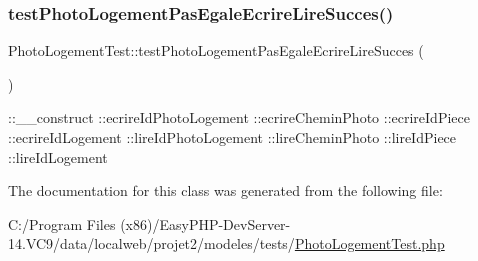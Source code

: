 \subsubsection{\texorpdfstring{test\+Photo\+Logement\+Pas\+Egale\+Ecrire\+Lire\+Succes()}{testPhotoLogementPasEgaleEcrireLireSucces()}}
{\footnotesize\ttfamily Photo\+Logement\+Test\+::test\+Photo\+Logement\+Pas\+Egale\+Ecrire\+Lire\+Succes (\begin{DoxyParamCaption}{ }\end{DoxyParamCaption})}

\+::\+\_\+\+\_\+construct  \+::ecrire\+Id\+Photo\+Logement  \+::ecrire\+Chemin\+Photo  \+::ecrire\+Id\+Piece  \+::ecrire\+Id\+Logement  \+::lire\+Id\+Photo\+Logement  \+::lire\+Chemin\+Photo  \+::lire\+Id\+Piece  \+::lire\+Id\+Logement 

The documentation for this class was generated from the following file\+:\begin{DoxyCompactItemize}
\item 
C\+:/\+Program Files (x86)/\+Easy\+P\+H\+P-\/\+Dev\+Server-\/14.\+V\+C9/data/localweb/projet2/modeles/tests/\hyperlink{_photo_logement_test_8php}{Photo\+Logement\+Test.\+php}\end{DoxyCompactItemize}
